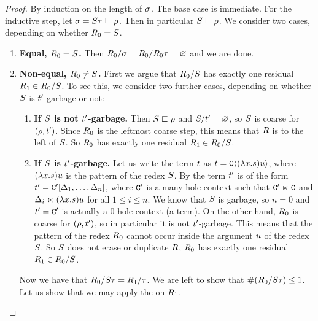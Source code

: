 \begin{proof}
By induction on the length of $\sigma$. The base case is immediate.
For the inductive step, let $\sigma = S \tau \sqsubseteq \rho$.
Then in particular $S \sqsubseteq \rho$.
We consider two cases, depending on whether $R_0 = S$.
\begin{enumerate}
\item {\bf Equal, $R_0 = S$.}
  Then $R_0/\sigma = R_0/R_0\tau = \varnothing$ and we are done.
\item {\bf Non-equal, $R_0 \neq S$.}
  First we argue that $R_0/S$ has exactly one residual $R_1 \in R_0/S$.
  To see this, we consider two further cases, depending on whether
  $S$ is $t'$-garbage or not:
  \begin{enumerate}
  \item {\bf If $S$ is not $t'$-garbage.}
    Then $S \sqsubseteq \rho$ and $S/t' = \varnothing$, so $S$ is coarse for $(\rho,t')$.
    Since $R_0$ is the leftmost coarse step, this means that $R$ is to the left of $S$.
    So $R_0$ has exactly one residual $R_1 \in R_0/S$.
  \item {\bf If $S$ is $t'$-garbage.}
    Let us write the term $t$ as $t = \mathtt{C}\langle(\lambda x. s)u\rangle$, where
    $(\lambda x. s)u$ is the pattern of the redex $S$.
    By 
    the term $t'$ is of the form $t' = \mathtt{C}'[\Delta_1,\hdots,\Delta_n]$,
    where $\mathtt{C}'$ is a many-hole context such that $\mathtt{C}' \mathrel{\ltimes} \mathtt{C}$
    and $\Delta_i \mathrel{\ltimes} (\lambda x. s)u$ for all $1 \leq i \leq n$.
    We know that $S$ is garbage, so $n = 0$ and $t' = \mathtt{C}'$ is actually
    a $0$-hole context (\ie a term).
    On the other hand, $R_0$ is coarse for $(\rho,t')$, so in particular
    it is not $t'$-garbage.
    This means that the pattern of the redex $R_0$ cannot occur inside the argument $u$
    of the redex $S$.
    So $S$ does not erase or duplicate $R$,
    \ie $R_0$ has exactly one residual $R_1 \in R_0/S$.
  \end{enumerate}
  Now we have that $R_0/S\tau = R_1/\tau$.
  We are left to show that $\#(R_0/S\tau) \leq 1$.
  Let us show that we may apply the \ih on $R_1$.

\end{enumerate}
\end{proof}
